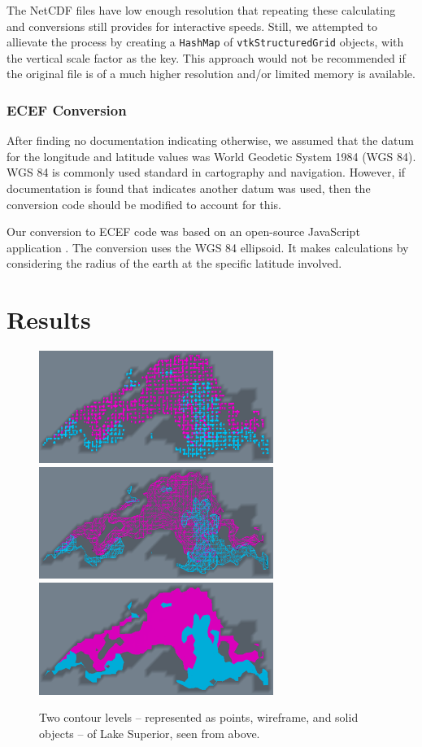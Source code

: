 \documentclass{article} %
\newcommand{\code}[1]{\texttt{#1}}
\begin{document}
The NetCDF files have low enough resolution that repeating these calculating and conversions still provides for interactive speeds.  Still, we attempted to allievate the process by creating a \code{HashMap} of \code{vtkStructuredGrid} objects, with the vertical scale factor as the key.  This approach would not be recommended if the original file is of a much higher resolution and/or limited memory is available.

\subsubsection{ECEF Conversion}

After finding no documentation indicating otherwise, we assumed that the datum for the longitude and latitude values was World Geodetic System 1984 (WGS 84).  WGS 84 is commonly used standard in cartography and navigation.  However, if documentation is found that indicates another datum was used, then the conversion code should be modified to account for this.

Our conversion to ECEF code was based on an open-source JavaScript application \cite{geodesy}.  The conversion uses the WGS 84 ellipsoid.  It makes calculations by considering the radius of the earth at the specific latitude involved.

\section{Results}

\begin{figure}[htb]
   \centering
   \includegraphics[width=3in]{figures/points.eps}
   \includegraphics[width=3in]{figures/wireframe.eps}
   \includegraphics[width=3in]{figures/surface.eps}
    \caption{Two contour levels -- represented as points, wireframe, and solid objects -- of Lake Superior, seen from above.}
   \label{fig:rep1}
\end{figure}
\end{document}

